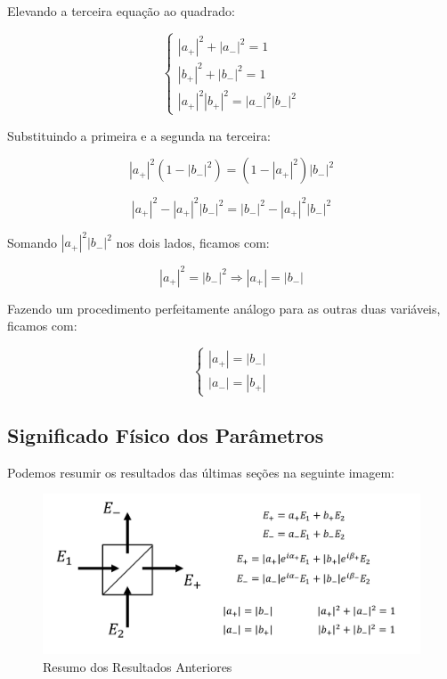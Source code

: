\documentclass[12pt,a4paper]{report}
\begin{document}
Elevando a terceira equação ao quadrado:

\begin{equation}
\begin{cases}
    |a_{+}|^2+|a_{-}|^2=1\\[0.3cm]
    |b_{+}|^2+|b_{-}|^2=1\\[0.3cm]
    |a_{+}|^2|b_{+}|^2=|a_{-}|^2|b_{-}|^2
\end{cases}
\label{coeficientes}
\end{equation}

Substituindo a primeira e a segunda na terceira:

\begin{equation}
    |a_{+}|^2(1-|b_{-}|^2)=(1-|a_{+}|^2)|b_{-}|^2
\end{equation}

\begin{equation}
    |a_{+}|^2-|a_{+}|^2|b_{-}|^2=|b_{-}|^2-|a_{+}|^2|b_{-}|^2
\end{equation}

Somando $|a_{+}|^2|b_{-}|^2$ nos dois lados, ficamos com:

\begin{equation}
    |a_{+}|^2=|b_{-}|^2 \Rightarrow |a_{+}|=|b_{-}|
\end{equation}

Fazendo um procedimento perfeitamente análogo para as outras duas variáveis, ficamos com:

\begin{equation}
\begin{cases}
    |a_{+}|=|b_{-}|\\[0.3cm]
    |a_{-}|=|b_{+}|
\end{cases}
\end{equation}

\subsection{Significado Físico dos Parâmetros}

Podemos resumir os resultados das últimas seções na seguinte imagem:

\begin{figure}[H]
    \centering
    \includegraphics[width=0.9\linewidth]{results.png}
    \caption{Resumo dos Resultados Anteriores}
    \label{resumo}
\end{figure}
\end{document}
